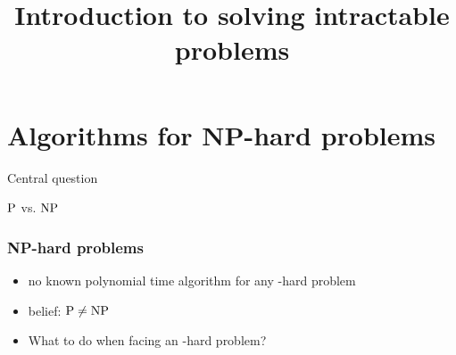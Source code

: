 


\newcommand{\mycomp}[1]{\pgfmathparse{#1}\pgfmathprintnumber[precision=0]{\pgfmathresult}}



\title[Introduction]
{Introduction to solving intractable problems}

\begin{frame}
  \titlepage{}
\end{frame}

\lecturenotes{\maketitle}

\begin{frame}
  \tableofcontents
\end{frame}

\section{Algorithms for NP-hard problems}

\begin{frame}

Central question
\begin{center}
{\huge $\P$ vs. $\NP$}
\end{center}
\end{frame}

\begin{frame}
 \frametitle{NP-hard problems}

 \begin{itemize}
  \item no known polynomial time algorithm for any \NP-hard problem
  \item belief: $\P \neq \NP$ 
  \item What to do when facing an \NP-hard problem?
 \end{itemize}
\end{frame}


